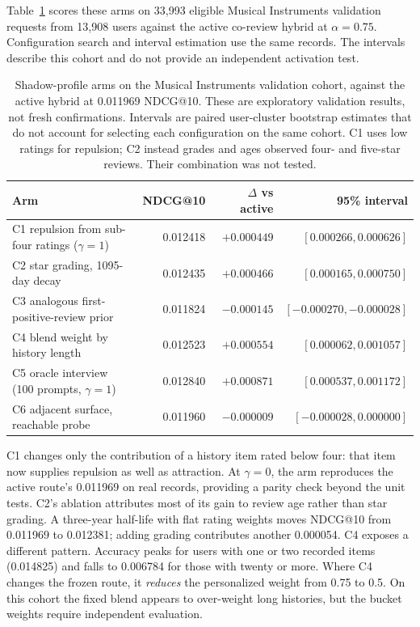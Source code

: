 \documentclass[11pt]{article}
\begin{document}
Table~\ref{tab:shadow} scores these arms on 33,993 eligible Musical Instruments validation requests from 13,908 users against the active co-review hybrid at $\alpha=0.75$. Configuration search and interval estimation use the same records. The intervals describe this cohort and do not provide an independent activation test.

\begin{table}[ht]
\centering
\caption{Shadow-profile arms on the Musical Instruments validation cohort, against the active hybrid at 0.011969 NDCG@10. These are exploratory validation results, not fresh confirmations. Intervals are paired user-cluster bootstrap estimates that do not account for selecting each configuration on the same cohort. C1 uses low ratings for repulsion; C2 instead grades and ages observed four- and five-star reviews. Their combination was not tested.}
\label{tab:shadow}
\small
\begin{tabular}{@{}lrrr@{}}
\toprule
Arm & NDCG@10 & $\Delta$ vs active & 95\% interval \\
\midrule
C1 repulsion from sub-four ratings ($\gamma=1$) & 0.012418 & $+0.000449$ & $[0.000266, 0.000626]$ \\
C2 star grading, 1095-day decay & 0.012435 & $+0.000466$ & $[0.000165, 0.000750]$ \\
C3 analogous first-positive-review prior & 0.011824 & $-0.000145$ & $[-0.000270, -0.000028]$ \\
C4 blend weight by history length & 0.012523 & $+0.000554$ & $[0.000062, 0.001057]$ \\
C5 oracle interview (100 prompts, $\gamma=1$) & 0.012840 & $+0.000871$ & $[0.000537, 0.001172]$ \\
C6 adjacent surface, reachable probe & 0.011960 & $-0.000009$ & $[-0.000028, 0.000000]$ \\
\bottomrule
\end{tabular}
\end{table}

C1 changes only the contribution of a history item rated below four: that item now supplies repulsion as well as attraction. At $\gamma=0$, the arm reproduces the active route's 0.011969 on real records, providing a parity check beyond the unit tests. C2's ablation attributes most of its gain to review age rather than star grading. A three-year half-life with flat rating weights moves NDCG@10 from 0.011969 to 0.012381; adding grading contributes another 0.000054. C4 exposes a different pattern. Accuracy peaks for users with one or two recorded items (0.014825) and falls to 0.006784 for those with twenty or more. Where C4 changes the frozen route, it \emph{reduces} the personalized weight from 0.75 to 0.5. On this cohort the fixed blend appears to over-weight long histories, but the bucket weights require independent evaluation.
\end{document}
